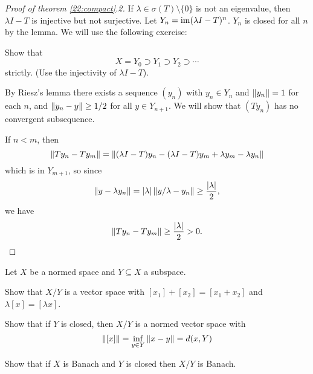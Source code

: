 \begin{proof}[Proof of theorem \ref{22:compact}.2]
  If $\lambda \in \sigma(T) \setminus \{0\}$ is not an eigenvalue, then $\lambda I-T$ is injective but not surjective.
  Let $Y_n = \operatorname{im}(\lambda I-T)^n$.
  $Y_n$ is closed for all $n$ by the lemma.
  We will use the following exercise:

  \begin{exer}
    Show that
    \[ X=Y_0 \supset Y_1 \supset Y_2 \supset \cdots \]
    strictly.
    (Use the injectivity of $\lambda I-T$).
  \end{exer}

  By Riesz's lemma there exists a sequence $(y_n)$ with $y_n \in Y_n$ and $\left\lVert y_n \right\rVert=1$ for each $n$, and $\left\lVert y_n-y \right\rVert \geq 1/2$ for all $y \in Y_{n+1}$.
  We will show that $(Ty_n)$ has no convergent subsequence.

  If $n<m$, then
  \[ \left\lVert Ty_n-Ty_m \right\rVert = \left\lVert (\lambda I-T)y_n - (\lambda I-T)y_m + \lambda y_m - \lambda y_n \right\rVert \]
  which is in $Y_{m+1}$, so since
  \[ \left\lVert y-\lambda y_n \right\rVert = \left\lvert \lambda \right\rvert \left\lVert y/\lambda-y_n \right\rVert \geq \frac{\left\lvert \lambda \right\rvert}{2}, \]
  we have
  \[ \left\lVert Ty_n-Ty_m \right\rVert \geq \frac{\left\lvert \lambda \right\rvert}{2} > 0. \qedhere \]
\end{proof}

\begin{exer}
  Let $X$ be a normed space and $Y \subseteq X$ a subspace.
  \begin{enum}
    \io
    Show that $X/Y$ is a vector space with $[x_1]+[x_2]=[x_1+x_2]$ and $\lambda[x] = [\lambda x]$.

    \io
    Show that if $Y$ is closed, then $X/Y$ is a normed vector space with 
    \[ \left\lVert [x] \right\rVert = \inf_{y \in Y} \left\lVert x-y \right\rVert = d(x,Y) \]

    \io
    Show that if $X$ is Banach and $Y$ is closed then $X/Y$ is Banach.
  \end{enum}
\end{exer}
